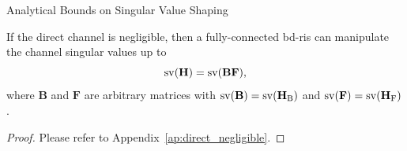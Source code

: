 \begin{section}{Analytical Bounds on Singular Value Shaping}
\begin{proposition}
		If the direct channel is negligible, then a fully-connected \gls{bd}-\gls{ris} can manipulate the channel singular values up to
		\begin{equation}
			\operatorname{sv}(\mathbf{H}) = \operatorname{sv}(\mathbf{BF}),
			\label{eq:sv_fully_connected}
		\end{equation}
		where $\mathbf{B}$ and $\mathbf{F}$ are arbitrary matrices with $\operatorname{sv}(\mathbf{B})=\operatorname{sv}(\mathbf{H}_\mathrm{B})$ and $\operatorname{sv}(\mathbf{F})=\operatorname{sv}(\mathbf{H}_\mathrm{F})$.
	\end{proposition}

	\begin{proof}
		Please refer to Appendix~\ref{ap:direct_negligible}.
	\end{proof}


\end{section}
